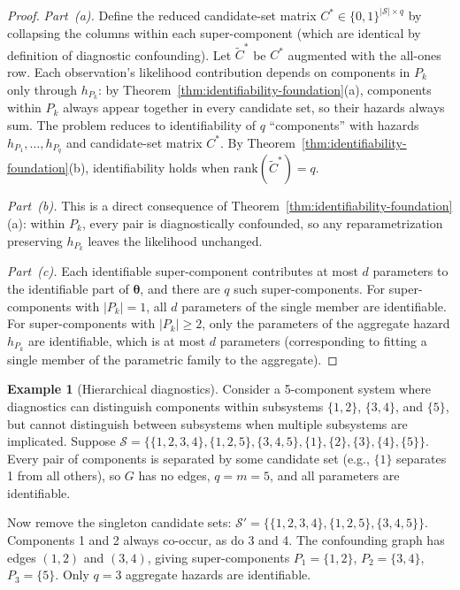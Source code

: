\documentclass[11pt]{article}
\theoremstyle{definition}
\newtheorem{example}{Example}
\theoremstyle{plain}
\renewcommand{\v}[1]{\boldsymbol{#1}}
\newcommand{\btheta}{\v{\theta}}
\newcommand{\rank}{\mathrm{rank}}
\newcommand{\Ctilde}{\tilde{C}}
\begin{document}
\begin{proof}
\emph{Part~(a).}
Define the reduced candidate-set matrix $C^* \in \{0,1\}^{|\mathcal{S}| \times q}$
by collapsing the columns within each super-component (which are
identical by definition of diagnostic confounding).
Let $\Ctilde^*$ be $C^*$ augmented with the all-ones row.
Each observation's likelihood contribution depends on components in
$P_k$ only through $h_{P_k}$: by
Theorem~\ref{thm:identifiability-foundation}(a), components within
$P_k$ always appear together in every candidate set, so their hazards
always sum.
The problem reduces to identifiability of $q$ ``components'' with
hazards $h_{P_1}, \ldots, h_{P_q}$ and candidate-set matrix $C^*$.
By Theorem~\ref{thm:identifiability-foundation}(b), identifiability
holds when $\rank(\Ctilde^*) = q$.

\emph{Part~(b).}
This is a direct consequence of
Theorem~\ref{thm:identifiability-foundation}(a): within $P_k$,
every pair is diagnostically confounded, so any reparametrization
preserving $h_{P_k}$ leaves the likelihood unchanged.

\emph{Part~(c).}
Each identifiable super-component contributes at most $d$ parameters
to the identifiable part of $\btheta$, and there are $q$ such
super-components.
For super-components with $|P_k| = 1$, all $d$ parameters of
the single member are identifiable.
For super-components with $|P_k| \geq 2$, only the parameters of
the aggregate hazard $h_{P_k}$ are identifiable, which is at most
$d$ parameters (corresponding to fitting a single member of the
parametric family to the aggregate).
\end{proof}

\begin{example}[Hierarchical diagnostics]
\label{ex:hierarchical}
Consider a 5-component system where diagnostics can distinguish
components within subsystems $\{1, 2\}$, $\{3, 4\}$, and $\{5\}$,
but cannot distinguish between subsystems when multiple subsystems
are implicated.
Suppose $\mathcal{S} = \bigl\{\{1,2,3,4\}, \{1,2,5\},
\{3,4,5\}, \{1\}, \{2\}, \{3\}, \{4\}, \{5\}\bigr\}$.
Every pair of components is separated by some candidate set
(e.g., $\{1\}$ separates 1 from all others), so $G$ has no edges,
$q = m = 5$, and all parameters are identifiable.

Now remove the singleton candidate sets:
$\mathcal{S}' = \bigl\{\{1,2,3,4\}, \{1,2,5\}, \{3,4,5\}\bigr\}$.
Components 1 and 2 always co-occur, as do 3 and 4.
The confounding graph has edges $(1,2)$ and $(3,4)$, giving
super-components $P_1 = \{1,2\}$, $P_2 = \{3,4\}$, $P_3 = \{5\}$.
Only $q = 3$ aggregate hazards are identifiable.
\end{example}
\end{document}
